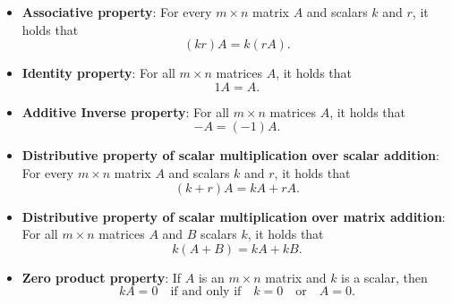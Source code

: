 \begin{theorem}  \label{matrixscalarmultprops} 
		
\begin{itemize}	
\item  \textbf{Associative property}:    For every  $m \times n$ matrix $A$ and scalars  $k$ and $r$, it holds that
\[ (kr)A = k(rA). \]
			
\item  \textbf{Identity property}: For all $m \times n$ matrices $A$, it holds that 
\[1A = A. \]
			
\item  \textbf{Additive Inverse property}:  For all $m \times n$ matrices $A$, it holds that
\[-A = (-1)A. \] 
			
\item  \textbf{Distributive property of scalar multiplication over scalar addition}:    For every  $m \times n$ matrix $A$ and scalars $k$ and $r$, it holds that
\[(k+r)A = kA + rA.\]
			
\item  \textbf{Distributive property of scalar multiplication over matrix addition}: For all $m \times n$ matrices $A$ and $B$ scalars $k$, it holds that
\[k(A+B) = kA + kB.\] 
			
\item  \textbf{Zero product property}:   If $A$ is an $m \times n$ matrix and $k$ is a scalar, then 
\[kA = 0 \quad \text{if and only if} \quad k=0 \quad \text{or} \quad A = 0.\]
			
\end{itemize}

\end{theorem}		


\smallskip

